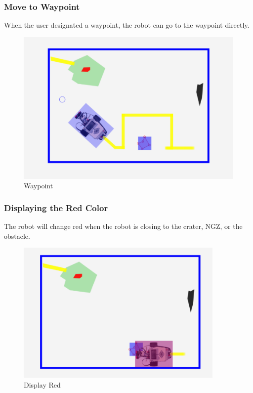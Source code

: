 \documentclass[10pt,a4paper,titlepage]{article}
\begin{document}
  \subsubsection{  Move to Waypoint} 
When the user designated a waypoint, the robot can go to the waypoint directly.  \begin{figure}[H] 
  \includegraphics[width=\linewidth]{waypoint.png}  %
  \caption{Waypoint} 
  \label{fig:Waypoint}               
  \end{figure} 
  
  
  
	\subsubsection{  Displaying the Red Color} 
The robot will change red when the robot is closing to the crater, NGZ, or the obstacle.  \begin{figure}[H] 
  \includegraphics[width=0.9\textwidth]{red.png}  %
  \caption{Display Red} 
  \label{fig:Display Red}               
  \end{figure} 
   
\end{document}
